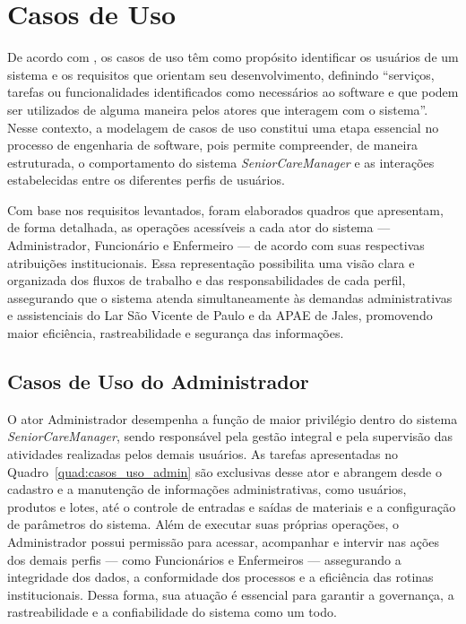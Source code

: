 \section{Casos de Uso}

De acordo com \textcite{Guedes2018}, os casos de uso têm como propósito identificar os usuários de um sistema e os requisitos que orientam seu desenvolvimento, definindo “serviços, tarefas ou funcionalidades identificados como necessários ao software e que podem ser utilizados de alguma maneira pelos atores que interagem com o sistema”. Nesse contexto, a modelagem de casos de uso constitui uma etapa essencial no processo de engenharia de software, pois permite compreender, de maneira estruturada, o comportamento do sistema \textit{SeniorCareManager} e as interações estabelecidas entre os diferentes perfis de usuários.

Com base nos requisitos levantados, foram elaborados quadros que apresentam, de forma detalhada, as operações acessíveis a cada ator do sistema — Administrador, Funcionário e Enfermeiro — de acordo com suas respectivas atribuições institucionais. Essa representação possibilita uma visão clara e organizada dos fluxos de trabalho e das responsabilidades de cada perfil, assegurando que o sistema atenda simultaneamente às demandas administrativas e assistenciais do Lar São Vicente de Paulo e da APAE de Jales, promovendo maior eficiência, rastreabilidade e segurança das informações.


\subsection{Casos de Uso do Administrador}

O ator Administrador desempenha a função de maior privilégio dentro do sistema \textit{SeniorCareManager}, sendo responsável pela gestão integral e pela supervisão das atividades realizadas pelos demais usuários. As tarefas apresentadas no Quadro~\ref{quad:casos_uso_admin} são exclusivas desse ator e abrangem desde o cadastro e a manutenção de informações administrativas, como usuários, produtos e lotes, até o controle de entradas e saídas de materiais e a configuração de parâmetros do sistema. Além de executar suas próprias operações, o Administrador possui permissão para acessar, acompanhar e intervir nas ações dos demais perfis — como Funcionários e Enfermeiros — assegurando a integridade dos dados, a conformidade dos processos e a eficiência das rotinas institucionais. Dessa forma, sua atuação é essencial para garantir a governança, a rastreabilidade e a confiabilidade do sistema como um todo.

